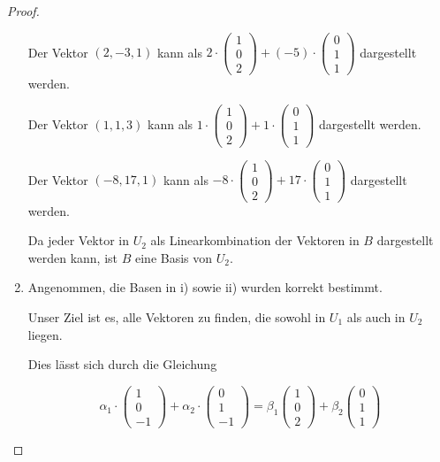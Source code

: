 \documentclass{../problemset}
\begin{document}
\begin{problem}
\begin{proof}
\begin{enumerate}
		      Der Vektor $(2, -3, 1)$ kann als $2 \cdot \begin{pmatrix} 1 \\ 0 \\ 2 \end{pmatrix} + (-5) \cdot \begin{pmatrix} 0 \\ 1 \\ 1 \end{pmatrix}$ dargestellt werden.

		      Der Vektor $(1, 1, 3)$ kann als $1 \cdot \begin{pmatrix} 1 \\ 0 \\ 2 \end{pmatrix} + 1 \cdot \begin{pmatrix} 0 \\ 1 \\ 1 \end{pmatrix}$ dargestellt werden.

		      Der Vektor $(-8, 17, 1)$ kann als $-8 \cdot \begin{pmatrix} 1 \\ 0 \\ 2 \end{pmatrix} + 17 \cdot \begin{pmatrix} 0 \\ 1 \\ 1 \end{pmatrix}$ dargestellt werden.

		      Da jeder Vektor in $U_2$ als Linearkombination der Vektoren in $B$ dargestellt werden kann, ist $B$ eine Basis von $U_2$.

		\item Angenommen, die Basen in i) sowie ii) wurden korrekt bestimmt.

		      Unser Ziel ist es, alle Vektoren zu finden, die sowohl in \(U_1\) als auch in \(U_2\) liegen.

		      Dies lässt sich durch die Gleichung

		      \[
			      \alpha_1 \cdot \begin{pmatrix}
				      1 \\
				      0 \\
				      -1
			      \end{pmatrix} + \alpha_2 \cdot \begin{pmatrix}
				      0 \\
				      1 \\
				      -1
			      \end{pmatrix} = \beta_1 \begin{pmatrix}
				      1 \\ 0 \\ 2
			      \end{pmatrix} + \beta_2 \begin{pmatrix}
				      0 \\ 1 \\ 1
			      \end{pmatrix}
		      \]


\end{enumerate}
\end{proof}
\end{problem}
\end{document}
